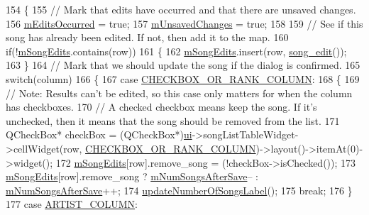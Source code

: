 \begin{DoxyCode}
154 \{
155     \textcolor{comment}{// Mark that edits have occurred and that there are unsaved changes.}
156     \mbox{\hyperlink{class_song_list_viewer_window_a939acaa75e8260232852266a5891fb5f}{mEditsOccurred}} = \textcolor{keyword}{true};
157     \mbox{\hyperlink{class_song_list_viewer_window_a150efbd08beb368c4acc65621d03d35d}{mUnsavedChanges}} = \textcolor{keyword}{true};
158 
159     \textcolor{comment}{// See if this song has already been edited. If not, then add it to the map.}
160     \textcolor{keywordflow}{if}(!\mbox{\hyperlink{class_song_list_viewer_window_aa38d8a91dc7ebe0925602b3846c34fdc}{mSongEdits}}.contains(row))
161     \{
162         \mbox{\hyperlink{class_song_list_viewer_window_aa38d8a91dc7ebe0925602b3846c34fdc}{mSongEdits}}.insert(row, \mbox{\hyperlink{class_song_list_viewer_window_a9d231624b8aaaceace0c6c3e1e389893}{song\_edit}}());
163     \}
164     \textcolor{comment}{// Mark that we should update the song if the dialog is confirmed.}
165     \textcolor{keywordflow}{switch}(column)
166     \{
167         \textcolor{keywordflow}{case} \mbox{\hyperlink{songlistviewerwindow_8h_a43772c536452cd8ed0af845b585487bf}{CHECKBOX\_OR\_RANK\_COLUMN}}:
168         \{
169             \textcolor{comment}{// Note: Results can't be edited, so this case only matters for when the column has checkboxes.}
170             \textcolor{comment}{// A checked checkbox means keep the song. If it's unchecked, then it means that the song
       should be removed from the list.}
171             QCheckBox* checkBox = (QCheckBox*)\mbox{\hyperlink{class_song_list_viewer_window_ac24fa09133b92a7b4cbd757f9b84258d}{ui}}->songListTableWidget->cellWidget(row, 
      \mbox{\hyperlink{songlistviewerwindow_8h_a43772c536452cd8ed0af845b585487bf}{CHECKBOX\_OR\_RANK\_COLUMN}})->layout()->itemAt(0)->widget();
172             \mbox{\hyperlink{class_song_list_viewer_window_aa38d8a91dc7ebe0925602b3846c34fdc}{mSongEdits}}[row].remove\_song = (!checkBox->isChecked());
173             \mbox{\hyperlink{class_song_list_viewer_window_aa38d8a91dc7ebe0925602b3846c34fdc}{mSongEdits}}[row].remove\_song ? \mbox{\hyperlink{class_song_list_viewer_window_a92cc7fd927ce7dc144f0febb0fdfa434}{mNumSongsAfterSave}}-- : 
      \mbox{\hyperlink{class_song_list_viewer_window_a92cc7fd927ce7dc144f0febb0fdfa434}{mNumSongsAfterSave}}++;
174             \mbox{\hyperlink{class_song_list_viewer_window_a6e956b2dc5372636eeeefbcb9e52c351}{updateNumberOfSongsLabel}}();
175             \textcolor{keywordflow}{break};
176         \}
177         \textcolor{keywordflow}{case} \mbox{\hyperlink{songlistviewerwindow_8h_a4df933f03e6d62e433d019b597e25109}{ARTIST\_COLUMN}}:

\end{DoxyCode}
